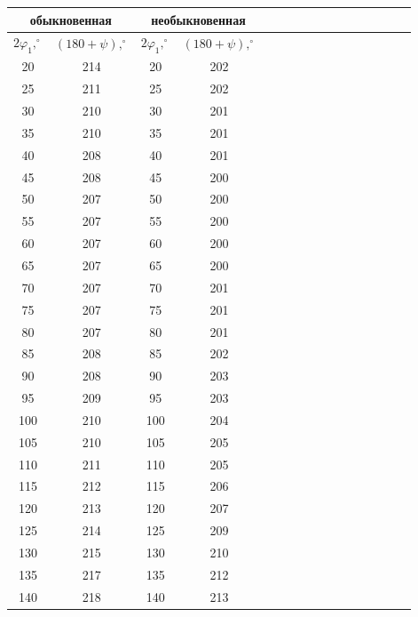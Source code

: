 \documentclass[14pt]{article}
\begin{document}
\begin{center}
\begin{tabular}{|c|c|c|c|c|c|c|c|c|c|c|c|c|c|c|c|}
\hline
\multicolumn{2}{|c|}{обыкновенная}					&	\multicolumn{2}{|c|}{необыкновенная}				\\
\hline
$2\varphi_1, ^\circ$	&	$(180 + \psi), ^\circ$	&	$2\varphi_1, ^\circ$	&	$(180 + \psi), ^\circ$	\\
\hline
20						&	214						&	20						&	202						\\
\hline
25						&	211						&	25						&	202						\\
\hline
30						&	210						&	30						&	201						\\
\hline
35						&	210						&	35						&	201						\\
\hline
40						&	208						&	40						&	201						\\
\hline
45						&	208						&	45						&	200						\\
\hline
50						&	207						&	50						&	200						\\
\hline
55						&	207						&	55						&	200						\\
\hline
60						&	207						&	60						&	200						\\
\hline
65						&	207						&	65						&	200						\\
\hline
70						&	207						&	70						&	201						\\
\hline
75						&	207						&	75						&	201						\\
\hline
80						&	207						&	80						&	201						\\
\hline
85						&	208						&	85						&	202						\\
\hline
90						&	208						&	90						&	203						\\
\hline
95						&	209						&	95						&	203						\\
\hline
100						&	210						&	100						&	204						\\
\hline
105						&	210						&	105						&	205						\\
\hline
110						&	211						&	110						&	205						\\
\hline
115						&	212						&	115						&	206						\\
\hline
120						&	213						&	120						&	207						\\
\hline
125						&	214						&	125						&	209						\\
\hline
130						&	215						&	130						&	210						\\
\hline
135						&	217						&	135						&	212						\\
\hline
140						&	218						&	140						&	213						\\
\hline
\end{tabular}
\end{center}
\end{document}
